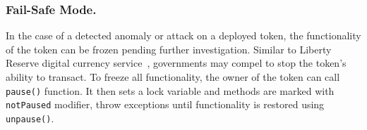 \subsubsection{Fail-Safe Mode.}

In the case of a detected anomaly or attack on a deployed \erc token, the functionality of the token can be frozen pending further investigation. { \blue Similar to Liberty Reserve digital currency service~\cite{LibertyReserve}, governments may compel to stop the token's ability to transact. } To freeze all functionality, the owner of the token can call \texttt{pause()} function. It then sets a lock variable and methods are marked with \texttt{notPaused} modifier, throw exceptions until functionality is restored using \texttt{unpause()}.


%

%

